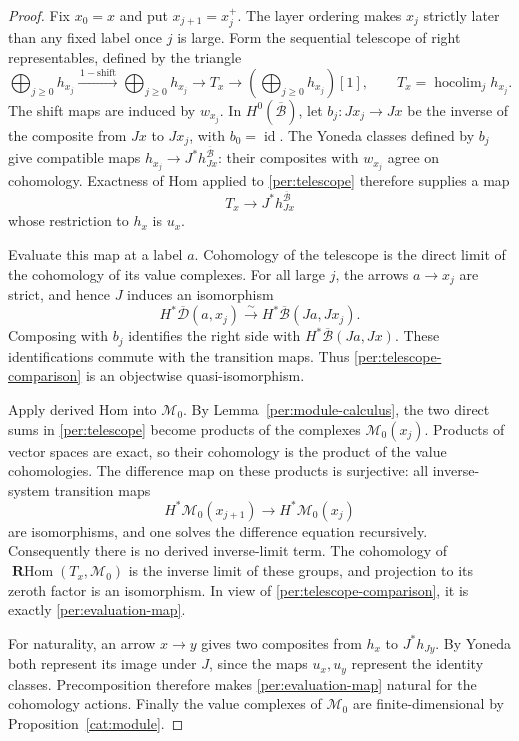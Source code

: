 \documentclass[11pt]{article}
\theoremstyle{definition}
\theoremstyle{remark}
\DeclareMathOperator{\id}{id}
\DeclareMathOperator{\RHom}{\mathbf R Hom}
\DeclareMathOperator{\hocolim}{hocolim}
\numberwithin{equation}{section}
\begin{document}
\begin{proof}
Fix $x_0=x$ and put $x_{j+1}=x_j^+$.  The layer ordering makes $x_j$
strictly later than any fixed label once $j$ is large.  Form the
sequential telescope of right representables, defined by the triangle
\begin{equation}
 \bigoplus_{j\ge0}h_{x_j}
  \xrightarrow{\,1-\mathrm{shift}\,}
 \bigoplus_{j\ge0}h_{x_j}
  \longrightarrow T_x\longrightarrow
 \left(\bigoplus_{j\ge0}h_{x_j}\right)[1],
 \qquad
 T_x=\hocolim_j h_{x_j}.
 \label{per:telescope}
\end{equation}
The shift maps are induced by $w_{x_j}$.  In
$H^0(\overline{\mathcal B})$, let
$b_j:Jx_j\to Jx$ be the inverse of the composite from $Jx$ to $Jx_j$,
with $b_0=\id$.  The Yoneda classes defined by $b_j$ give compatible
maps
$h_{x_j}\to J^*h_{Jx}^{\overline{\mathcal B}}$: their composites with
$w_{x_j}$ agree on cohomology.  Exactness of Hom applied to
\eqref{per:telescope} therefore supplies a map
\begin{equation}
 T_x\longrightarrow J^*h_{Jx}^{\overline{\mathcal B}}
 \label{per:telescope-comparison}
\end{equation}
whose restriction to $h_x$ is $u_x$.

Evaluate this map at a label $a$.  Cohomology of the telescope is the
direct limit of the cohomology of its value complexes.  For all large
$j$, the arrows $a\to x_j$ are strict, and hence $J$ induces an
isomorphism
\[
 H^*\overline{\mathcal D}(a,x_j)
    \xrightarrow{\ \sim\ }
 H^*\overline{\mathcal B}(Ja,Jx_j).
\]
Composing with $b_j$ identifies the right side with
$H^*\overline{\mathcal B}(Ja,Jx)$.  These identifications commute with
the transition maps.  Thus \eqref{per:telescope-comparison} is an
objectwise quasi-isomorphism.

Apply derived Hom into $\mathcal M_0$.  By
Lemma~\ref{per:module-calculus}, the two direct sums in
\eqref{per:telescope} become products of the complexes
$\mathcal M_0(x_j)$.  Products of vector spaces are exact, so their
cohomology is the product of the value cohomologies.  The difference
map on these products is surjective: all inverse-system transition
maps
\[
 H^*\mathcal M_0(x_{j+1})\longrightarrow H^*\mathcal M_0(x_j)
\]
are isomorphisms, and one solves the difference equation recursively.
Consequently there is no derived inverse-limit term.  The cohomology
of $\RHom(T_x,\mathcal M_0)$ is the inverse limit of these groups,
and projection to its zeroth factor is an isomorphism.  In view of
\eqref{per:telescope-comparison}, it is exactly
\eqref{per:evaluation-map}.

For naturality, an arrow $x\to y$ gives two composites from $h_x$ to
$J^*h_{Jy}$.  By Yoneda both represent its image under $J$, since the
maps $u_x,u_y$ represent the identity classes.  Precomposition
therefore makes \eqref{per:evaluation-map} natural for the
cohomology actions.  Finally the value complexes of $\mathcal M_0$
are finite-dimensional by Proposition~\ref{cat:module}.
\end{proof}
\end{document}
